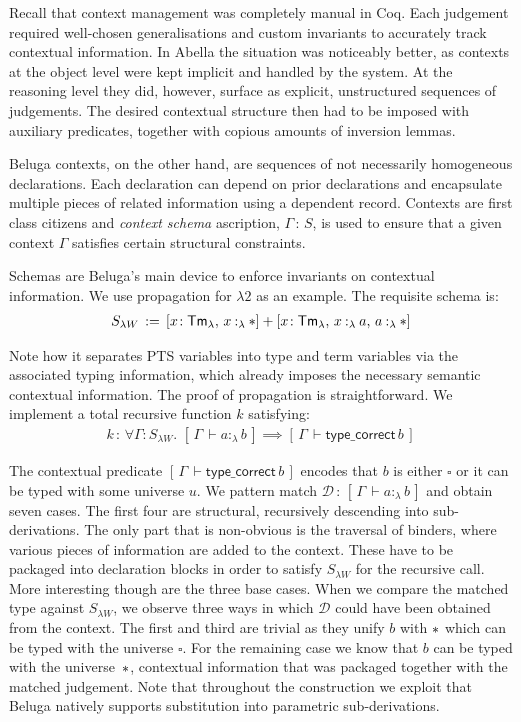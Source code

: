 \documentclass[a4paper,UKenglish]{lipics-v2016}
\newcommand{\ms}{\,}
\newcommand{\mrel}[1]{\mathrel{\ms #1 \ms}}
\newcommand{\OF}{\mrel{:}}
\newcommand{\mAll}[1]{\ensuremath{\forall} #1.\ms\ms}
\newcommand{\eqdef}{\mrel{:=}}
\newcommand{\SysL}{$\lambda2$\xspace}
\newcommand{\TmL}{\ensuremath{\mathsf{Tm_{\lambda}}}}
\newcommand{\of}{\ensuremath{\!:\!}}
\newcommand{\typingLh}[2]{\ensuremath{#1 \mathbin{:_{\lambda}} #2}}
\newcommand{\Prp}{\ensuremath{\textrm{\textasteriskcentered}}}
\newcommand{\Typ}{\ensuremath{\square}}
\newcommand{\D}{\mathcal{D}}
\newcommand{\bc}[2]{\ensuremath{[\,#1\,\vdash #2\,]}}
\newcommand{\sof}{\ensuremath{\!:}}
\newcommand{\ssep}{\ensuremath{,\ms}}
\theoremstyle{plain}
\begin{document}
Recall that context management was completely manual in Coq.
Each judgement required well-chosen generalisations and custom invariants to accurately track contextual information.
In Abella the situation was noticeably better, as contexts at the object level were kept implicit and handled by the system.
At the reasoning level they did, however, surface as explicit, unstructured sequences of judgements.
The desired contextual structure then had to be imposed with auxiliary predicates, together with copious amounts of inversion lemmas.

Beluga contexts, on the other hand, are sequences of not necessarily homogeneous declarations.
Each declaration can depend on prior declarations and encapsulate multiple pieces of related information using a dependent record.
Contexts are first class citizens and \emph{context schema} ascription, $\Gamma \OF S$, is used to ensure that a given context $\Gamma$ satisfies certain structural constraints.

Schemas are Beluga's main device to enforce invariants on contextual information.
We use propagation for \SysL as an example.
The requisite schema is:
\begin{align*}
  S_{\lambda W} \eqdef [x\sof\TmL \ssep \typingLh{x}{\Prp}] + [x\sof\TmL \ssep \typingLh{x}{a} \ssep \typingLh{a}{\Prp}]
\end{align*}

Note how it separates PTS variables into type and term variables via the associated typing information, which already imposes the necessary semantic contextual information.
The proof of propagation is straightforward.
We implement a total recursive function $k$ satisfying:
\begin{align*}
  k \OF \mAll{\Gamma \of S_{\lambda W}} \bc{\Gamma}{\typingLh{a}{b}} \implies \bc{\Gamma}{\mathsf{type\_correct}\,b}
\end{align*}

The contextual predicate $\bc{\Gamma}{\mathsf{type\_correct}\,b}$ encodes that $b$ is either $\Typ$ or it can be typed with some universe $u$.
We pattern match $\D \OF \bc{\Gamma}{\typingLh{a}{b}}$ and obtain seven cases.
The first four are structural, recursively descending into sub-derivations.
The only part that is non-obvious is the traversal of binders, where various pieces of information are added to the context.
These have to be packaged into declaration blocks in order to satisfy $S_{\lambda W}$ for the recursive call.
More interesting though are the three base cases.
When we compare the matched type against $S_{\lambda W}$, we observe three ways in which $\D$ could have been obtained from the context.
The first and third are trivial as they unify $b$ with $\Prp$ which can be typed with the universe $\Typ$.
For the remaining case we know that $b$ can be typed with the universe~$\Prp$, contextual information that was packaged together with the matched judgement.
Note that throughout the construction we exploit that Beluga natively supports substitution into parametric sub-derivations.
\end{document}
